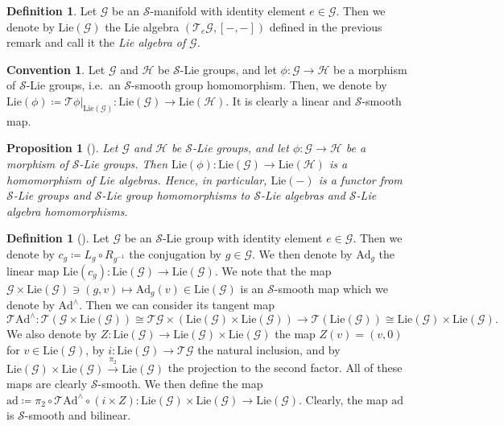 \documentclass[12pt,a4paper]{article}
\theoremstyle{plain}
\newtheorem{proposition}[theorem]{Proposition}
\theoremstyle{definition}
\newtheorem{definition}[theorem]{Definition}
\newtheorem{convention}[theorem]{Convention}
\newcommand{\Hcal}{\mathcal{H}}
\newcommand{\Scal}{\mathcal{S}}
\newcommand{\Gcal}{\mathcal{G}}
\begin{document}
\begin{definition}
Let $\Gcal$ be an $\Scal$-manifold with identity element $e\in \Gcal$. Then we denote by $\mathrm{Lie}(\Gcal)$ the Lie algebra $(\mathcal T_e\Gcal,[-,-])$ defined in the previous remark and call it the \textit{Lie algebra of $\Gcal$}.
\end{definition}

\begin{convention}
Let $\Gcal$ and $\Hcal$ be $\Scal$-Lie groups, and let $\phi:\Gcal\to \Hcal$ be a morphism of $\Scal$-Lie groups, i.e.~an $\Scal$-smooth group homomorphism. Then, we denote by
$\mathrm{Lie}(\phi)\coloneqq \left.\mathcal{T}\phi\right|_{\mathrm{Lie}(\Gcal)}:\mathrm{Lie}(\Gcal)\to \mathrm{Lie}(\Hcal)$. It is clearly a linear and $\Scal$-smooth map.
\end{convention}


\begin{proposition}[{\cite[Proposition III.1.8]{InfDimLieneeb}}]
Let $\Gcal$ and $\Hcal$ be $\Scal$-Lie groups, and let $\phi:\Gcal\to \Hcal$ be a morphism of $\Scal$-Lie groups. Then $\mathrm{Lie}(\phi):\mathrm{Lie}(\Gcal)\to \mathrm{Lie}(\Hcal)$ is a homomorphism of Lie algebras. Hence, in particular, $\mathrm{Lie}(-)$ is a functor from $\Scal$-Lie groups and $\Scal$-Lie group homomorphisms to $\Scal$-Lie algebras and $\Scal$-Lie algebra homomorphisms.    
\end{proposition}


\begin{definition}[{\cite[Definition III.1.15]{InfDimLieneeb}}]
\label{Def:AdAndad}
Let $\Gcal$ be an $\Scal$-Lie group with identity element $e\in \Gcal$. Then we denote by $c_g\coloneqq L_g\circ R_{g^{-1}}$ the conjugation by $g\in \Gcal$. We then denote by $\mathrm{Ad}_g$ the linear map $\mathrm{Lie}(c_g):\mathrm{Lie}(\Gcal) \to \mathrm{Lie}(\Gcal)$. We note that the map $\Gcal\times \mathrm{Lie}(\Gcal)\ni (g,v)\mapsto \mathrm{Ad}_g(v)\in \mathrm{Lie}(\Gcal)$ is an $\Scal$-smooth map which we denote by 
$\mathrm{Ad}^{\wedge}$. Then we can consider its tangent map $$\mathcal{T}\mathrm{Ad}^\wedge:\mathcal{T}(\Gcal\times \mathrm{Lie}(\Gcal))\cong \mathcal{T}\Gcal\times (\mathrm{Lie}(\Gcal)\times \mathrm{Lie}(\Gcal))\to \mathcal{T}(\mathrm{Lie}(\Gcal))\cong \mathrm{Lie}(\Gcal)\times \mathrm{Lie}(\Gcal).$$ We also denote by $Z:\mathrm{Lie}(\Gcal)\to \mathrm{Lie}(\Gcal)\times \mathrm{Lie}(\Gcal)$ the map $Z(v)=(v,0)$ for $v\in \mathrm{Lie}(\Gcal)$, by $i:\mathrm{Lie}(\Gcal)\to \mathcal T \Gcal$ the natural inclusion, and by $\mathrm{Lie}(\Gcal)\times \mathrm{Lie}(\Gcal)\xrightarrow{\pi_2}\mathrm{Lie}(\Gcal)$ the projection to the second factor. All of these maps are clearly $\Scal$-smooth.
We then define the map $\mathrm{ad}\coloneqq \pi_2\circ \mathcal T \mathrm{Ad}^\wedge \circ (i\times Z): \mathrm{Lie}(\Gcal)\times\mathrm{Lie}(\Gcal)\to \mathrm{Lie}(\Gcal)$. Clearly, the map $\mathrm{ad}$ is $\Scal$-smooth and bilinear.
\end{definition}
\end{document}
